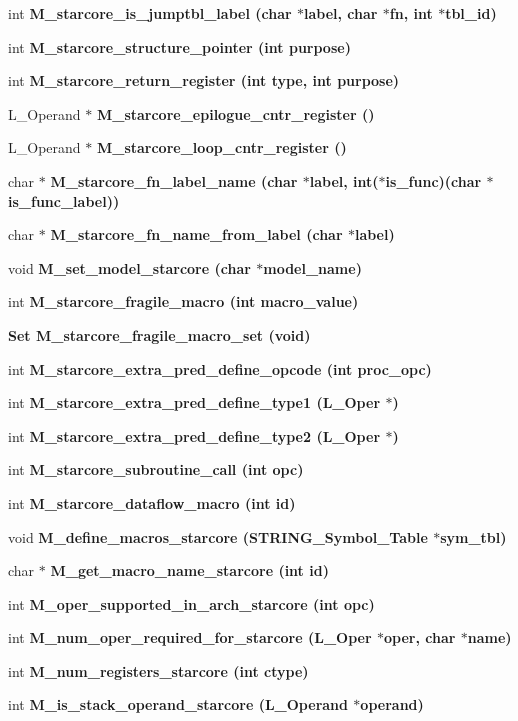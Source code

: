 \begin{CompactItemize}
\item 
int \bf{M\_\-starcore\_\-is\_\-jumptbl\_\-label} (char $\ast$label, char $\ast$fn, int $\ast$tbl\_\-id)
\item 
int \bf{M\_\-starcore\_\-structure\_\-pointer} (int purpose)
\item 
int \bf{M\_\-starcore\_\-return\_\-register} (int type, int purpose)
\item 
L\_\-Operand $\ast$ \bf{M\_\-starcore\_\-epilogue\_\-cntr\_\-register} ()
\item 
L\_\-Operand $\ast$ \bf{M\_\-starcore\_\-loop\_\-cntr\_\-register} ()
\item 
char $\ast$ \bf{M\_\-starcore\_\-fn\_\-label\_\-name} (char $\ast$label, int($\ast$is\_\-func)(char $\ast$is\_\-func\_\-label))
\item 
char $\ast$ \bf{M\_\-starcore\_\-fn\_\-name\_\-from\_\-label} (char $\ast$label)
\item 
void \bf{M\_\-set\_\-model\_\-starcore} (char $\ast$model\_\-name)
\item 
int \bf{M\_\-starcore\_\-fragile\_\-macro} (int macro\_\-value)
\item 
\bf{Set} \bf{M\_\-starcore\_\-fragile\_\-macro\_\-set} (void)
\item 
int \bf{M\_\-starcore\_\-extra\_\-pred\_\-define\_\-opcode} (int proc\_\-opc)
\item 
int \bf{M\_\-starcore\_\-extra\_\-pred\_\-define\_\-type1} (L\_\-Oper $\ast$)
\item 
int \bf{M\_\-starcore\_\-extra\_\-pred\_\-define\_\-type2} (L\_\-Oper $\ast$)
\item 
int \bf{M\_\-starcore\_\-subroutine\_\-call} (int opc)
\item 
int \bf{M\_\-starcore\_\-dataflow\_\-macro} (int id)
\item 
void \bf{M\_\-define\_\-macros\_\-starcore} (\bf{STRING\_\-Symbol\_\-Table} $\ast$sym\_\-tbl)
\item 
char $\ast$ \bf{M\_\-get\_\-macro\_\-name\_\-starcore} (int id)
\item 
int \bf{M\_\-oper\_\-supported\_\-in\_\-arch\_\-starcore} (int opc)
\item 
int \bf{M\_\-num\_\-oper\_\-required\_\-for\_\-starcore} (L\_\-Oper $\ast$oper, char $\ast$\bf{name})
\item 
int \bf{M\_\-num\_\-registers\_\-starcore} (int ctype)
\item 
int \bf{M\_\-is\_\-stack\_\-operand\_\-starcore} (L\_\-Operand $\ast$operand)
\item 

\end{CompactItemize}
